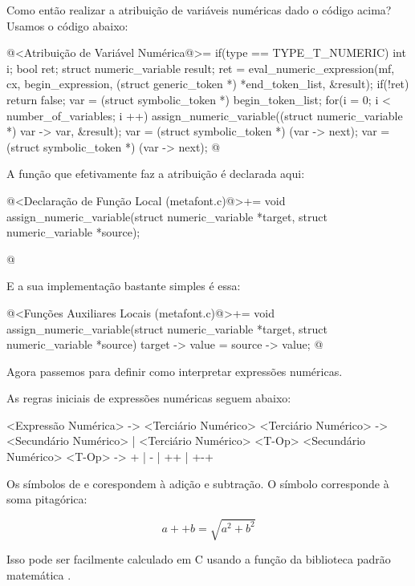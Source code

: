 
Como então realizar a atribuição de variáveis numéricas dado o código
acima? Usamos o código abaixo:

\iniciocodigo
@<Atribuição de Variável Numérica@>=
if(type == TYPE_T_NUMERIC){
  int i;
  bool ret;
  struct numeric_variable result;
  ret = eval_numeric_expression(mf, cx, begin_expression,
                               (struct generic_token *) *end_token_list,
                                &result);
  if(!ret)
    return false;
  var = (struct symbolic_token *) begin_token_list;
  for(i = 0; i < number_of_variables; i ++){
    assign_numeric_variable((struct numeric_variable *) var -> var,
                            &result);
    var = (struct symbolic_token *) (var -> next);
    var = (struct symbolic_token *) (var -> next);
  }
}
@
\fimcodigo

A função que efetivamente faz a atribuição é declarada aqui:

\iniciocodigo
@<Declaração de Função Local (metafont.c)@>+=
void assign_numeric_variable(struct numeric_variable *target,
                            struct numeric_variable *source);

@
\fimcodigo

E a sua implementação bastante simples é essa:

\iniciocodigo
@<Funções Auxiliares Locais (metafont.c)@>+=
void assign_numeric_variable(struct numeric_variable *target,
                            struct numeric_variable *source){
  target -> value = source -> value;
}
@
\fimcodigo

Agora passemos para definir como interpretar expressões numéricas.


As regras iniciais de expressões numéricas seguem abaixo:

\alinhaverbatim
<Expressão Numérica> -> <Terciário Numérico>
<Terciário Numérico> -> <Secundário Numérico> |
                        <Terciário Numérico> <T-Op> <Secundário Numérico>
<T-Op> -> + | - | ++ | +-+
\alinhanormal

Os símbolos de \monoespaco{+} e \monoespaco{-} corespondem à adição e
subtração. O símbolo \monoespaco{++} corresponde à soma pitagórica:

$$
a ++ b = \sqrt{a^2 + b^2}
$$

Isso pode ser facilmente calculado em C usando a função da biblioteca
padrão matemática .

